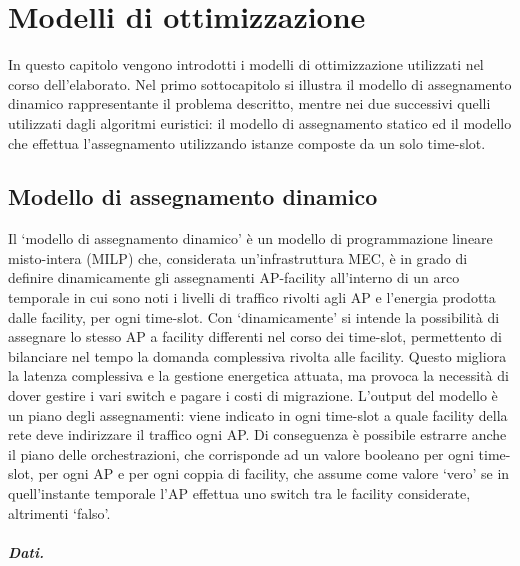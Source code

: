 \chapter{Modelli di ottimizzazione}
\label{cap:modelli-ottimizzazione}

In questo capitolo vengono introdotti i modelli di ottimizzazione utilizzati nel corso dell'elaborato. Nel primo sottocapitolo si illustra il modello di assegnamento dinamico rappresentante il problema descritto, mentre nei due successivi quelli utilizzati dagli algoritmi euristici: il modello di assegnamento statico ed il modello che effettua l'assegnamento utilizzando istanze composte da un solo time-slot.


%
%
\section{Modello di assegnamento dinamico}
\label{sec:modello-completo}

Il `modello di assegnamento dinamico' è un modello di programmazione lineare misto-intera (MILP) che, considerata un'infrastruttura MEC, è in grado di definire dinamicamente gli assegnamenti AP-facility all'interno di un arco temporale in cui sono noti i livelli di traffico rivolti agli AP e l'energia prodotta dalle facility, per ogni time-slot. Con `dinamicamente' si intende la possibilità di assegnare lo stesso AP a facility differenti nel corso dei time-slot, permettento di bilanciare nel tempo la domanda complessiva rivolta alle facility. Questo migliora la latenza complessiva e la gestione energetica attuata, ma provoca la necessità di dover gestire i vari switch e pagare i costi di migrazione. L'output del modello è un piano degli assegnamenti: viene indicato in ogni time-slot a quale facility della rete deve indirizzare il traffico ogni AP. Di conseguenza è possibile estrarre anche il piano delle orchestrazioni, che corrisponde ad un valore booleano per ogni time-slot, per ogni AP e per ogni coppia di facility, che assume come valore `vero' se in quell'instante temporale l'AP effettua uno switch tra le facility considerate, altrimenti `falso'.

\paragraph*{Dati.}

